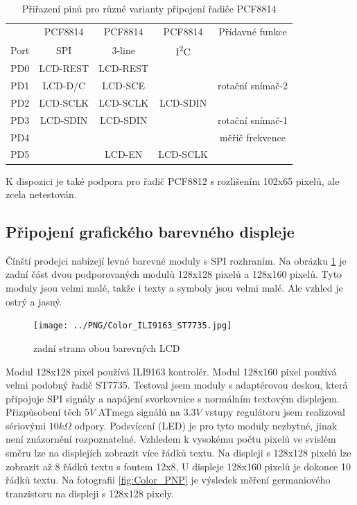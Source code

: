 \begin{table}[H]
  \begin{center}
    \begin{tabular}{| c || c | c | c | c |}
    \hline
           &  PCF8814    & PCF8814        & PCF8814     & Přídavné funkce \\
      Port &    SPI      & 3-line         &   I\textsuperscript{2}C      & \\
    \hline
    \hline
    PD0    &   LCD-REST  & LCD-REST       &            & \\
    \hline
    PD1    &   LCD-D/C   & LCD-SCE        &             & rotační snímač-2 \\
    \hline
    PD2    &   LCD-SCLK  & LCD-SCLK       &  LCD-SDIN   & \\
    \hline
    PD3    &   LCD-SDIN  & LCD-SDIN       &             & rotační snímač-1 \\
    \hline
    PD4    &             &                &             & měřič frekvence \\
    \hline
    PD5    &             & LCD-EN         &   LCD-SCLK  & \\
    \hline
    \end{tabular}
  \end{center}
\vspace{-0.6cm} 
  \caption{Přiřazení pinů pro různé varianty připojení řadiče PCF8814}
  \label{tab:PCF8814-con}
\end{table}
\vspace{-0.3cm} 
K dispozici je také podpora pro řadič PCF8812 s rozlišením 102x65 pixelů,
ale zcela netestován.
\vspace{-0.3cm} 
\subsection{Připojení grafického barevného displeje}
\vspace{-0.3cm} 
Čínští prodejci nabízejí levné barevné moduly s SPI rozhraním.
Na obrázku \ref{fig:Color_both} je zadní část dvou podporovaných modulů 128x128 pixelů
a 128x160 pixelů.
Tyto moduly jsou velmi malé, takže i texty a symboly jsou velmi malé.
Ale vzhled je ostrý a jasný.

\begin{figure}[H]
\centering
\texttt{[image: ../PNG/Color\_ILI9163\_ST7735.jpg]}
\caption{zadní strana obou barevných LCD}
\label{fig:Color_both}
\end{figure}

Modul 128x128 pixel používá ILI9163 kontrolér.
Modul 128x160 pixel používá velmi podobný řadič ST7735.
Testoval jsem moduly s adaptérovou deskou, která připojuje
SPI signály  a napájení svorkovnice s normálním textovým displejem.
Přizpůsobení těch \(5V\) ATmega signálů na \(3.3V\) vstupy regulátoru
jsem realizoval sériovými \(10k\Omega\) odpory.
Podsvícení (LED) je pro tyto moduly nezbytné, jinak není znázornění rozpoznatelné. 
Vzhledem k vysokému počtu pixelů ve svislém směru lze na displejích zobrazit více řádků textu.
Na displeji s 128x128 pixelů lze zobrazit až 8 řádků textu s fontem 12x8,
U displeje 128x160 pixelů je dokonce 10 řádků textu.
Na fotografii \ref{fig:Color_PNP} je výsledek měření germaniového tranzistoru na
displeji s 128x128 pixely.

